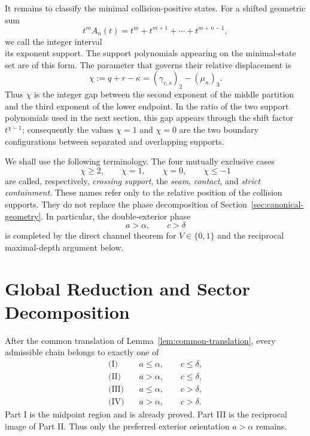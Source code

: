 \documentclass[11pt]{article}
\theoremstyle{definition}
\begin{document}
It remains to classify the minimal collision-positive states.  For a shifted geometric sum
\begin{equation*}
t^mA_n(t)=t^m+t^{m+1}+\cdots+t^{m+n-1},
\end{equation*}
we call the integer interval
\begin{equation*}
[m,m+n-1]
\end{equation*}
its exponent support.  The support polynomials appearing on the minimal-state set are of this form.  The parameter that governs their relative displacement is
\begin{equation*}
\chi
:=
q+r-\kappa
=
(\gamma_{r,s})_2-(\mu_\kappa)_3.
\end{equation*}
Thus \(\chi\) is the integer gap between the second exponent of the middle partition and the third exponent of the lower endpoint.  In the ratio of the two support polynomials used in the next section, this gap appears through the shift factor
\(t^{\chi-1}\); consequently the values \(\chi=1\) and \(\chi=0\) are the two boundary configurations between separated and overlapping supports.

We shall use the following terminology.  The four mutually exclusive cases
\begin{equation*}
\chi\ge2,
\qquad
\chi=1,
\qquad
\chi=0,
\qquad
\chi\le-1
\end{equation*}
are called, respectively, \emph{crossing support}, the \emph{seam}, \emph{contact}, and \emph{strict containment}.  These names refer only to the relative position of the collision supports.  They do not replace the phase decomposition of Section~\ref{sec:canonical-geometry}.  In particular, the double-exterior phase
\begin{equation*}
a>\alpha,
\qquad
c>\delta
\end{equation*}
is completed by the direct channel theorem for \(V\in\{0,1\}\) and the reciprocal maximal-depth argument below.


\section{Global Reduction and Sector Decomposition}
\label{sec:global-roadmap}
After the common translation of Lemma~\ref{lem:common-translation}, every admissible chain belongs to exactly one of
\begin{align*}
\text{(I)}\quad &a\le\alpha,\qquad c\le\delta,\\
\text{(II)}\quad &a>\alpha,\qquad c\le\delta,\\
\text{(III)}\quad &a\le\alpha,\qquad c>\delta,\\
\text{(IV)}\quad &a>\alpha,\qquad c>\delta.
\end{align*}
Part I is the midpoint region and is already proved.  Part III is the reciprocal image of Part II.  Thus only the preferred exterior orientation \(a>\alpha\) remains.
\end{document}
